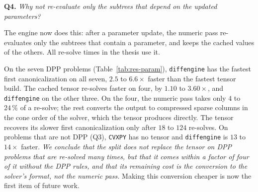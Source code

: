 \documentclass[letterpaper,12pt]{article}
\newcommand{\ac}[1]{#1}
\newcommand{\question}[2]{\FloatBarrier\par\bigskip\textbf{Q#1.} \emph{#2}\par}
\begin{document}
\question{4}{Why not re-evaluate only the subtrees that depend on the updated parameters?}
The engine now does this: after a parameter update, the numeric pass re-evaluates only the
subtrees that contain a parameter, and keeps the cached values of the others. All re-solve
times in the thesis use it.

On the seven \ac{DPP} problems (Table~\ref{tab:res-param}), \texttt{diffengine} has the fastest
first canonicalization on all seven, $2.5$ to $6.6\times$ faster than the fastest tensor build. The
cached tensor re-solves faster on four, by $1.10$ to $3.60\times$, and \texttt{diffengine} on
the other three. On the four, the numeric pass takes only $4$ to $24\,\%$ of a re-solve; the
rest converts the output to compressed sparse columns in the cone order of the solver, which
the tensor produces directly. The tensor recovers its slower first canonicalization only after
$18$ to $124$ re-solves. On problems that are not \ac{DPP} (Q3),
\texttt{CVXPY} has no tensor and \texttt{diffengine} is $13$ to $14\times$ faster. \emph{We conclude that
the split does not replace the tensor on \ac{DPP} problems that are re-solved many times, but
that it comes within a factor of four of it without the \ac{DPP} rules, and that its remaining
cost is the conversion to the solver's format, not the numeric pass.} Making this conversion
cheaper is now the first item of future work.
\end{document}
